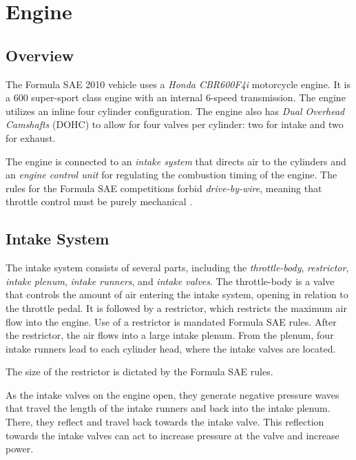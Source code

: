 \section{Engine}

\subsection{Overview}


The Formula SAE 2010 vehicle uses a \emph{Honda CBR600F4i} motorcycle engine. It is a \unit{600}{\centi\cubic\metre} super-sport class engine with an internal 6-speed transmission. The engine utilizes an inline four cylinder configuration. The engine also has \emph{Dual Overhead Camshafts} (DOHC) to allow for four valves per cylinder: two for intake and two for exhaust.

The engine is connected to an \emph{intake system} that directs air to the cylinders and an \emph{engine control unit} for regulating the combustion timing of the engine. The rules for the Formula SAE competitions forbid \emph{drive-by-wire}, meaning that throttle control must be purely mechanical \cite{2010fsaerules}.


\subsection{Intake System}

The intake system consists of several parts, including the \emph{throttle-body}, \emph{restrictor}, \emph{intake plenum}, \emph{intake runners}, and \emph{intake valves}. The throttle-body is a valve that controls the amount of air entering the intake system, opening in relation to the throttle pedal. It is followed by a restrictor, which restricts the maximum air flow into the engine. Use of a restrictor is mandated Formula SAE rules. After the restrictor, the air flows into a large intake plenum. From the plenum, four intake runners lead to each cylinder head, where the intake valves are located.

The size of the restrictor is dictated by the Formula SAE rules.

As the intake valves on the engine open, they generate negative pressure waves that travel the length of the intake runners and back into the intake plenum. There, they reflect and travel back towards the intake valve. This reflection towards the intake valves can act to increase pressure at the valve and increase power.

